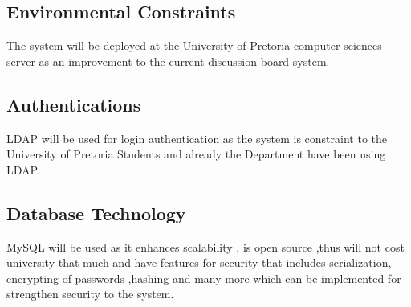 \begin{enumerate}
				\subsection{Environmental Constraints}
					The system will be deployed at the University of Pretoria computer sciences server as an 									improvement to the current discussion board system.
					
					\subsection{Authentications}
					LDAP will be used for login authentication as the system is constraint to the University of 									Pretoria Students and already the Department have been using LDAP.
					
					\subsection{Database Technology}
					MySQL will be used as it enhances scalability , is open source ,thus will not cost university that 					much and have features for security that includes serialization, encrypting of passwords ,hashing 						and many more which can be implemented for strengthen security to the system.

		
					
				
				
	\end{enumerate}

%
